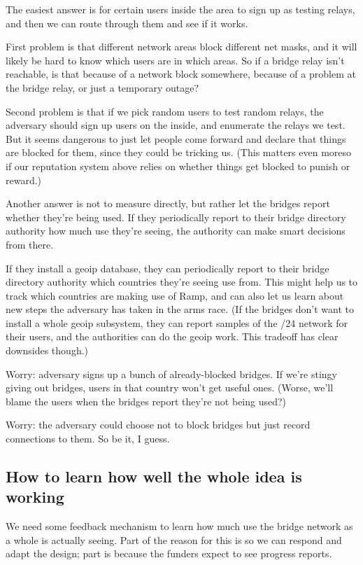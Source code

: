 \documentclass{llncs}
\begin{document}
The easiest answer is for certain users inside the area to sign up as
testing relays, and then we can route through them and see if it works.

First problem is that different network areas block different net masks,
and it will likely be hard to know which users are in which areas. So
if a bridge relay isn't reachable, is that because of a network block
somewhere, because of a problem at the bridge relay, or just a temporary
outage?

Second problem is that if we pick random users to test random relays, the
adversary should sign up users on the inside, and enumerate the relays
we test. But it seems dangerous to just let people come forward and
declare that things are blocked for them, since they could be tricking
us. (This matters even moreso if our reputation system above relies on
whether things get blocked to punish or reward.)

Another answer is not to measure directly, but rather let the bridges
report whether they're being used. If they periodically report to their
bridge directory authority how much use they're seeing, the authority
can make smart decisions from there.

If they install a geoip database, they can periodically report to their
bridge directory authority which countries they're seeing use from. This
might help us to track which countries are making use of Ramp, and can
also let us learn about new steps the adversary has taken in the arms
race. (If the bridges don't want to install a whole geoip subsystem, they
can report samples of the /24 network for their users, and the authorities
can do the geoip work. This tradeoff has clear downsides though.)

Worry: adversary signs up a bunch of already-blocked bridges. If we're
stingy giving out bridges, users in that country won't get useful ones.
(Worse, we'll blame the users when the bridges report they're not
being used?)

Worry: the adversary could choose not to block bridges but just record
connections to them. So be it, I guess.

\subsection{How to learn how well the whole idea is working}

We need some feedback mechanism to learn how much use the bridge network
as a whole is actually seeing. Part of the reason for this is so we can
respond and adapt the design; part is because the funders expect to see
progress reports.
\end{document}
